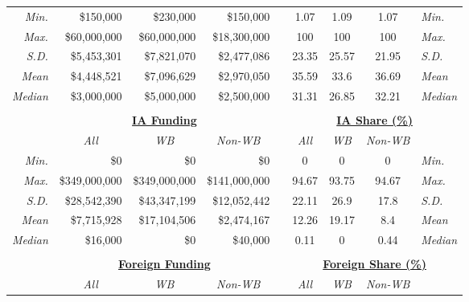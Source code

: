 \documentclass{article}
\begin{document}
\begin{singlespace}
\begin{table}[H]
{\begin{tabular}{rrrrlcccl}
		\textit{Min.} & \$150,000 & \$230,000 & \$150,000 &  & 1.07 & 1.09 & 1.07 & \textit{Min.} \\
		\textit{Max.} & \$60,000,000 & \$60,000,000 & \$18,300,000 &  & 100 & 100 & 100 & \textit{Max.} \\
		\textit{S.D.} & \$5,453,301 & \$7,821,070 & \$2,477,086 &  & 23.35 & 25.57 & 21.95 & \textit{S.D.} \\
		\textit{Mean} & \$4,448,521 & \$7,096,629 & \$2,970,050 &  & 35.59 & 33.6 & 36.69 & \textit{Mean} \\
		\textit{Median} & \$3,000,000 & \$5,000,000 & \$2,500,000 &  & 31.31 & 26.85 & 32.21 & \textit{Median} \\ \hline
		\multicolumn{1}{l}{} & \multicolumn{1}{l}{} & \multicolumn{1}{l}{} & \multicolumn{1}{l}{} &  & \multicolumn{1}{l}{} & \multicolumn{1}{l}{} & \multicolumn{1}{l}{} &  \\
		\multicolumn{1}{c}{{\ul \textbf{}}} & \multicolumn{3}{c}{{\ul \textbf{IA Funding}}} & \multicolumn{1}{c}{{\ul \textbf{}}} & \multicolumn{4}{c}{{\ul \textbf{IA Share (\%)}}} \\
		\multicolumn{1}{c}{\textit{}} & \multicolumn{1}{c}{\textit{All}} & \multicolumn{1}{c}{\textit{WB}} & \multicolumn{1}{c}{\textit{Non-WB}} & \multicolumn{1}{c}{\textit{}} & \textit{All} & \textit{WB} & \textit{Non-WB} & \multicolumn{1}{c}{\textit{}} \\
		\textit{Min.} & \$0 & \$0 & \$0 &  & 0 & 0 & 0 & \textit{Min.} \\
		\textit{Max.} & \$349,000,000 & \$349,000,000 & \$141,000,000 &  & 94.67 & 93.75 & 94.67 & \textit{Max.} \\
		\textit{S.D.} & \$28,542,390 & \$43,347,199 & \$12,052,442 &  & 22.11 & 26.9 & 17.8 & \textit{S.D.} \\
		\textit{Mean} & \$7,715,928 & \$17,104,506 & \$2,474,167 &  & 12.26 & 19.17 & 8.4 & \textit{Mean} \\
		\textit{Median} & \$16,000 & \$0 & \$40,000 &  & 0.11 & 0 & 0.44 & \textit{Median} \\ \hline
		\multicolumn{1}{l}{} & \multicolumn{1}{l}{} & \multicolumn{1}{l}{} & \multicolumn{1}{l}{} &  & \multicolumn{1}{l}{} & \multicolumn{1}{l}{} & \multicolumn{1}{l}{} &  \\
		\multicolumn{1}{c}{{\ul \textit{\textbf{}}}} & \multicolumn{3}{c}{{\ul \textbf{Foreign Funding}}} & \multicolumn{1}{c}{{\ul \textbf{}}} & \multicolumn{4}{c}{{\ul \textbf{Foreign Share (\%)}}} \\
		\multicolumn{1}{c}{} & \multicolumn{1}{c}{\textit{All}} & \multicolumn{1}{c}{\textit{WB}} & \multicolumn{1}{c}{\textit{Non-WB}} & \multicolumn{1}{c}{\textit{}} & \textit{All} & \textit{WB} & \textit{Non-WB} & \multicolumn{1}{c}{} \\

\end{tabular}}
\end{table}
\end{singlespace}
\end{document}
